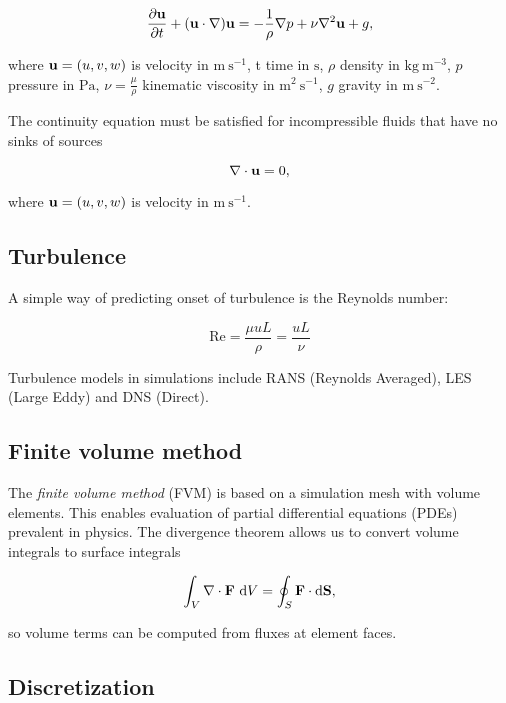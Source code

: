 \documentclass[12pt]{article}
\newcommand{\D}{\text{d}}
\newcommand{\un}[1]{ \text{#1}}
\newcommand{\up}[2]{\text{#1}^{#2}} %
\newcommand{\vb}[1]{\text{\textbf{#1}}}
\begin{document}
\begin{equation}
  \frac{\partial \vb u}{\partial t} + (\vb u \cdot \nabla) \vb u = -\frac{1}{\rho} \nabla p + \nu \nabla^2 \vb u + g,
\end{equation}

where $\vb u = (u, v, w)$ is velocity in $\un{m} \ \up{s}{-1}$, t time in $\un{s}$, $\rho$ density in $\un{kg} \ \up{m}{-3}$, $p$ pressure in $\un{Pa}$, $\nu=\frac{\mu}{\rho}$ kinematic viscosity in $\up{m}{2} \ \up{s}{-1}$, $g$ gravity in $\un{m} \ \up{s}{-2}$.

The continuity equation must be satisfied for incompressible fluids that have no sinks of sources

\begin{equation}
  \nabla \cdot \vb u = 0,
\end{equation}

where $\vb u = (u, v, w)$ is velocity in $\un{m} \ \up{s}{-1}$.

\subsection{Turbulence}

\noindent

A simple way of predicting onset of turbulence is the Reynolds number:

$$
\text{Re} = \frac{\mu u L}{\rho} = \frac{u L}{\nu}
$$

Turbulence models in simulations include RANS (Reynolds Averaged), LES (Large Eddy) and DNS (Direct).

\subsection{Finite volume method}

The \textit{finite volume method} (FVM) is based on a simulation mesh with volume elements. This enables evaluation of partial differential equations (PDEs) prevalent in physics. The divergence theorem allows us to convert volume integrals to surface integrals

$$
\int_V \nabla \cdot \vb F \ \D V = \oint_S \vb F \cdot \D \vb S,
$$

\noindent
so volume terms can be computed from fluxes at element faces.

\subsection{Discretization}
\end{document}
